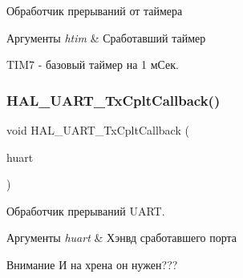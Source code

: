 Обработчик прерываний от таймера 


\begin{DoxyParams}{Аргументы}
{\em htim} & Сработавший таймер\\
\hline
\end{DoxyParams}
T\+I\+M7 -\/ базовый таймер на 1 мСек. \mbox{\label{group___callback_gabcdf9b59049eccbc87d54042f9235b1a}} 
\subsubsection{\texorpdfstring{H\+A\+L\+\_\+\+U\+A\+R\+T\+\_\+\+Tx\+Cplt\+Callback()}{HAL\_UART\_TxCpltCallback()}}
{\footnotesize\ttfamily void H\+A\+L\+\_\+\+U\+A\+R\+T\+\_\+\+Tx\+Cplt\+Callback (\begin{DoxyParamCaption}\item[{U\+A\+R\+T\+\_\+\+Handle\+Type\+Def $\ast$}]{huart }\end{DoxyParamCaption})}



Обработчик прерываний U\+A\+RT. 


\begin{DoxyParams}{Аргументы}
{\em huart} & Хэнвд сработавшего порта \\
\hline
\end{DoxyParams}
\begin{DoxyAttention}{Внимание}
И на хрена он нужен??? 
\end{DoxyAttention}
